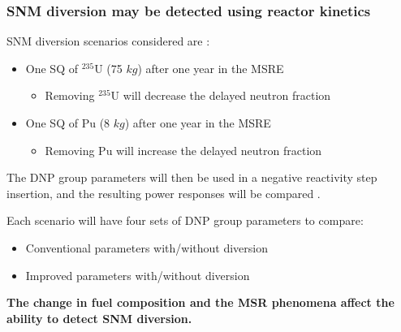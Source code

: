 

\begin{frame}
  \frametitle{SNM diversion may be detected using reactor kinetics}
    \begin{block}{\Gls{SNM} diversion scenarios considered are \cite{protection2011evaluation, international2022iaea, bathke2012attractive}:}
        \begin{itemize}
            \item One \gls{SQ} of $^{235}$U (75 $kg$) after one year in the \gls{MSRE}
            \begin{itemize}
                \item Removing $^{235}$U will decrease the delayed neutron fraction
            \end{itemize}
            \item One \gls{SQ} of Pu (8 $kg$) after one year in the \gls{MSRE}
            \begin{itemize}
                \item Removing Pu will increase the delayed neutron fraction
            \end{itemize}
        \end{itemize}
    \end{block}
    The \gls{DNP} group parameters will then be used in a negative reactivity step insertion, and the resulting power responses will be compared \cite{wheeler2021signatures}.
    \begin{block}{Each scenario will have four sets of \gls{DNP} group parameters to compare:}
    \begin{itemize}
        \item Conventional parameters with/without diversion
        \item Improved parameters with/without diversion
    \end{itemize}
    \end{block}

    \textbf{The change in fuel composition and the \gls{MSR} phenomena affect the ability to detect \gls{SNM} diversion.}

\end{frame}

